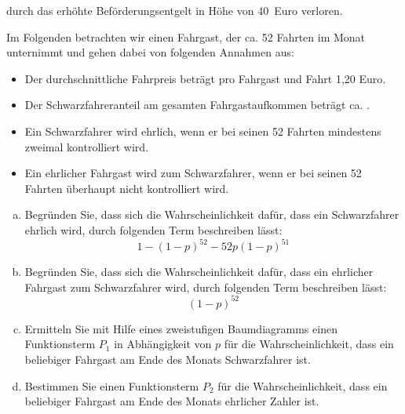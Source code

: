 \begin{exercise}
\begin{enumerate}[1)]
            durch das \glqq erhöhte Beförderungsentgelt\grqq{} in Höhe von
            40~Euro verloren.\par
            Im Folgenden betrachten wir einen Fahrgast, der ca. 52 Fahrten
            im Monat unternimmt und gehen dabei von folgenden Annahmen aus:
            \begin{itemize}
              \item Der durchschnittliche Fahrpreis beträgt pro Fahrgast
                    und Fahrt 1,20 Euro.
              \item Der Schwarzfahreranteil am gesamten Fahrgastaufkommen
                    beträgt ca. .
              \item Ein Schwarzfahrer wird ehrlich, wenn er bei seinen 52
                    Fahrten mindestens zweimal kontrolliert wird.
              \item Ein ehrlicher Fahrgast wird zum Schwarzfahrer, wenn er
                    bei seinen 52 Fahrten überhaupt nicht kontrolliert wird.
            \end{itemize}
            \begin{enumerate}[a)]
              \item Begründen Sie, dass sich die Wahrscheinlichkeit dafür,
                    dass ein Schwarzfahrer ehrlich wird, durch folgenden
                    Term beschreiben lässt:
                    \begin{equation*}
                      1-(1-p)^{52}-52p(1-p)^{51}
                    \end{equation*}
              \item Begründen Sie, dass sich die Wahrscheinlichkeit dafür,
                    dass ein ehrlicher Fahrgast zum Schwarzfahrer wird, durch
                    folgenden Term beschreiben lässt:
                    \begin{equation*}
                      (1-p)^{52}
                    \end{equation*}
              \item Ermitteln Sie mit Hilfe eines zweistufigen Baumdiagramms
                    einen Funktionsterm $P_{1}$ in Abhängigkeit von $p$ für
                    die Wahrscheinlichkeit, dass ein beliebiger Fahrgast
                    am Ende des Monats Schwarzfahrer ist.
              \item Bestimmen Sie einen Funktionsterm $P_{2}$ für die
                    Wahrscheinlichkeit, dass ein beliebiger Fahrgast am
                    Ende des Monats ehrlicher Zahler ist.

\end{enumerate}
\end{enumerate}
\end{exercise}
